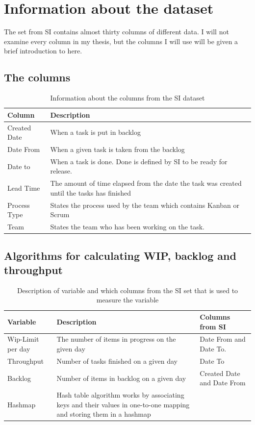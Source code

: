 \documentclass[UKenglish]{ifimaster}  %
\begin{document}
\section{Information about the dataset}
The set from SI contains almost thirty columns of different data. I will not examine every column in my thesis, but the columns I will use will be given a brief introduction to here.
\newpage
\subsection{The columns}
\begin{table}[ht]
\begin{center}
    \begin{tabular}{| l | p{5cm} |}
    \hline
     Column & Description\\ \hline
     Created Date & When a task is put in backlog \\ \hline
     Date From & When a given task is taken from the backlog\\ \hline
     Date to & When a task is done. Done is defined by SI to be ready for release. \\ \hline
    Lead Time & The amount of time elapsed from the date the task was created until the tasks has finished  \\ \hline
   Process Type &States the process used by the team which contains Kanban or Scrum \\
    \hline
    Team &States the team who has been working on the task.\\ \hline
    \end{tabular}
\caption{Information about the columns from the SI dataset}
\label{IC} %
\end{center}
\end{table}

\subsection {Algorithms for calculating WIP, backlog and throughput}
\begin{table}[ht]
\begin{center}
    \begin{tabular}{| l | l | p{5cm} |}
    \hline
    Variable &	Description	 & Columns from SI\\ \hline 
    Wip-Limit per day & \parbox[t]{5cm}{The number of items in progress on the given day} & Date From and Date To. \\ \hline
    Throughput	& Number of tasks finished on a given day & Date To \\ \hline
    Backlog & Number of items in backlog on a given day & Created Date and Date From\\ \hline
 Hashmap &\parbox[t]{7cm}{Hash table algorithm works by associating keys and their values in one-to-one mapping and storing them in a hashmap \parencite{Hashmap}} & \\ \hline
\end{tabular}
\caption{Description of variable and which columns from the SI set that is used to measure the variable}
\label{des} %
\end{center}
\end{table}
\end{document}
